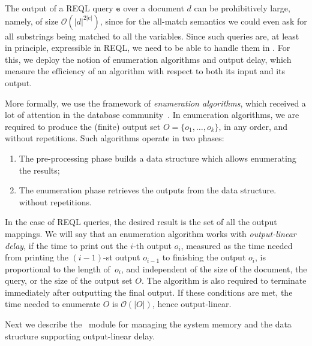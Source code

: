 
The output of a REQL query $\texttt{e}$ over a document $d$ can be prohibitively
large, namely, of size $\mathcal{O}(|d|^{2|e|})$, since for the all-match
semantics we could even ask for all substrings being matched to all the
variables. Since such queries are, at least in principle, expressible in REQL,
we need to be able to handle them in \rematch. For this, we deploy the notion of
enumeration algorithms and output delay, which measure the efficiency of an
algorithm  %
with respect to both its input and its output.

More formally, we use the framework of \emph{enumeration algorithms}, which
received a lot of attention in the database
community~\citep{AmarilliBMN-tods21,FlorenzanoRUVV20,LosemannM-lics14,SchweikardtSV-jacm22,BerkholzGS-siglog20,Segoufin13,IdrisUVVL-vldbj20,IdrisUV-sigmod17,TziavelisAGRY-pvldb20}.
In enumeration algorithms, we are required to produce the (finite) output set $O
= \{o_1,\ldots ,o_k\}$, in any order, and without repetitions. Such algorithms
operate in two phases:
\begin{enumerate}
	\item The pre-processing phase builds a data structure which allows
	enumerating the results;
	\item The enumeration phase retrieves the outputs from the data structure.%
	without repetitions.
\end{enumerate}
In the case of REQL queries, the desired result is the set of all the output
mappings. We will say that an enumeration algorithm works with
\emph{output-linear delay}, if the time to print out the $i$-th output $o_i$,
measured as the time needed from printing the $(i-1)$-st output $o_{i-1}$ to
finishing the output $o_i$, is proportional to the length of~$o_i$, and
independent of the size of the document, the query, or the size of the output
set $O$. The algorithm is also required to terminate immediately after
outputting the final output. If these conditions are met, the time needed to
enumerate $O$ is $\mathcal{O}(|O|)$, hence output-linear. 

Next we describe the \rematch\ module for managing the system memory and the
data structure supporting output-linear delay.

